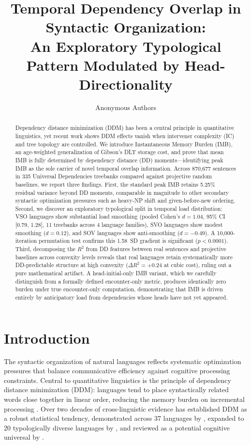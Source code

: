 \documentclass[11pt,letterpaper]{article}
\title{Temporal Dependency Overlap in Syntactic Organization:\\An Exploratory Typological Pattern Modulated by Head-Directionality}
\author{%
  Anonymous Authors%
}
\date{}
\begin{document}
\maketitle

\begin{abstract}
Dependency distance minimization (DDM) has been a central principle in quantitative linguistics, yet recent work shows DDM effects vanish when intervener complexity (IC) and tree topology are controlled. We introduce Instantaneous Memory Burden (IMB), an age-weighted generalization of Gibson's DLT storage cost, and prove that mean IMB is fully determined by dependency distance (DD) moments---identifying peak IMB as the sole carrier of novel temporal overlap information. Across 870,677 sentences in 335 Universal Dependencies treebanks compared against projective random baselines, we report three findings. First, the standard peak IMB retains 5.25\% residual variance beyond DD moments, comparable in magnitude to other secondary syntactic optimization pressures such as heavy-NP shift and given-before-new ordering. Second, we discover an exploratory typological split in temporal load distribution: VSO languages show substantial load smoothing (pooled Cohen's $d = 1.04$, 95\% CI [0.79, 1.28], 11 treebanks across 4 language families), SVO languages show modest smoothing ($d = 0.12$), and SOV languages show anti-smoothing ($d = -0.49$). A 10,000-iteration permutation test confirms this 1.58~SD gradient is significant ($p < 0.0001$). Third, decomposing the $R^2$ from DD features between real sentences and projective baselines across convexity levels reveals that real languages retain systematically more DD-predictable structure at high convexity ($\Delta R^2 = +0.24$ at cubic cost), ruling out a pure mathematical artifact. A head-initial-only IMB variant, which we carefully distinguish from a formally defined encounter-only metric, produces identically zero burden under true encounter-only computation, demonstrating that IMB is driven entirely by anticipatory load from dependencies whose heads have not yet appeared.
\end{abstract}


\section{Introduction}
\label{sec:introduction}

The syntactic organization of natural languages reflects systematic optimization pressures that balance communicative efficiency against cognitive processing constraints. Central to quantitative linguistics is the principle of dependency distance minimization (DDM): languages tend to place syntactically related words close together in linear order, reducing the memory burden on incremental processing \citep{Gibson1998, Futrell2015}. Over two decades of cross-linguistic evidence has established DDM as a robust statistical tendency, demonstrated across 37 languages by \citet{Futrell2015}, expanded to 20 typologically diverse languages by \citet{Liu2008}, and reviewed as a potential cognitive universal by \citet{Temperley2018}.
\end{document}
